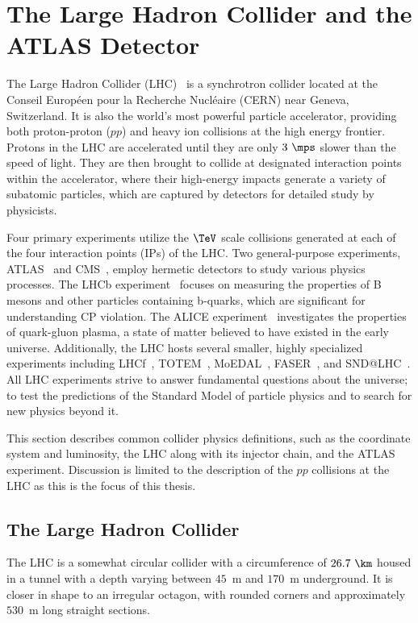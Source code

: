 
\chapter{The Large Hadron Collider and the ATLAS Detector}
\label{ch:lhc_atlas_detector}

The Large Hadron Collider (LHC)~\cite{LHCMachine,LHC1,LHC2, LHC3} is a synchrotron collider located at the Conseil Européen pour la Recherche Nucléaire (CERN) near Geneva, Switzerland.
It is also the world's most powerful particle accelerator, providing both proton-proton ($pp$) and heavy ion collisions at the high energy frontier.
Protons in the LHC are accelerated until they are only $3~\mps$ slower than the speed of light.
They are then brought to collide at designated interaction points within the accelerator, where their high-energy impacts generate a variety of subatomic particles, which are captured by detectors for detailed study by physicists.

Four primary experiments utilize the $\TeV$ scale collisions generated at each of the four interaction points (IPs) of the LHC.
Two general-purpose experiments, ATLAS~\cite{ATLAS} and CMS~\cite{CMS}, employ hermetic detectors to study various physics processes.
The LHCb experiment~\cite{LHCb} focuses on measuring the properties of B mesons and other particles containing b-quarks, which are significant for understanding CP violation.
The ALICE experiment~\cite{ALICE} investigates the properties of quark-gluon plasma, a state of matter believed to have existed in the early universe.
Additionally, the LHC hosts several smaller, highly specialized experiments including LHCf~\cite{LHCf}, TOTEM~\cite{TOTEM}, MoEDAL~\cite{MoEDAL}, FASER~\cite{FASER}, and SND@LHC~\cite{SNDLHC}.
All LHC experiments strive to answer fundamental questions about the universe; to test the predictions of the Standard Model of particle physics and to search for new physics beyond it.

This section describes common collider physics definitions, such as the coordinate system and luminosity,
the LHC along with its injector chain, and the ATLAS experiment.
Discussion is limited to the description of the $pp$ collisions at the LHC as this is the focus of this thesis.

\section{The Large Hadron Collider}

The LHC is a somewhat circular collider with a circumference of $26.7~\km$ housed in a tunnel with a depth varying between $45$~m and $170$~m underground.
It is closer in shape to an irregular octagon, with rounded corners and approximately $530$~m long straight sections.

